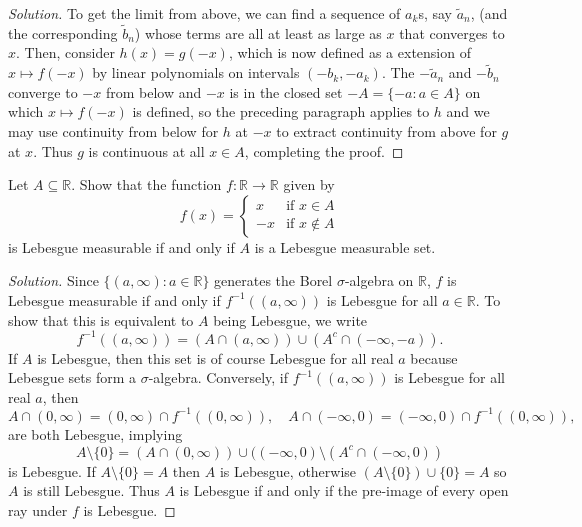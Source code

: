 \documentclass[10pt]{article}
\providecommand{\RR}{\mathbb R}
\providecommand{\inv}{^{-1}}
\newenvironment{soln}{\begin{proof}[Solution]}{\end{proof}}
\begin{document}
\begin{soln}
    To get the limit from above, we can find a sequence of $a_k$s,
    say $\widetilde a_n$, (and the corresponding $\widetilde b_n$) whose terms are
    all at least as large as $x$ that converges to $x$.
    Then, consider $h(x) = g(-x)$, which is now defined
    as a extension of $x\mapsto f(-x)$ by linear polynomials on intervals
    $(-b_k,-a_k)$. The $-\widetilde a_n$ and $-\widetilde b_n$
    converge to $-x$ from below and $-x$ is in the closed set
    $-A = \{-a : a\in A\}$ on which $x\mapsto f(-x)$
    is defined, so the preceding paragraph applies to $h$
    and we may use continuity from below
    for $h$ at $-x$ to extract continuity from above for $g$ at $x$.
    Thus $g$ is continuous at all $x\in A$, completing the proof.
\end{soln}

\begin{problem}
    Let $A\subseteq\RR$. Show that the function $f\colon\RR\to\RR$ given by
    \begin{equation*}
        f(x) = \begin{cases}
	    x & \text{if }x\in A\\
	    -x & \text{if }x\notin A
        \end{cases}
    \end{equation*}
    is Lebesgue measurable if and only if $A$ is a Lebesgue measurable set.
\end{problem}

\begin{soln}
    Since $\{(a,\infty) : a\in\RR\}$ generates the Borel $\sigma$-algebra on $\RR$,
    $f$ is Lebesgue measurable if and only if $f\inv((a,\infty))$ is Lebesgue
    for all $a\in\RR$. To show that this is equivalent to $A$ being Lebesgue,
    we write
    \begin{equation*}
        f\inv((a,\infty)) = (A\cap(a,\infty)) \cup (A^c\cap(-\infty,-a)).
    \end{equation*}
    If $A$ is Lebesgue, then this set is of course Lebesgue for all real $a$
    because Lebesgue sets form a $\sigma$-algebra.
    Conversely, if $f\inv((a,\infty))$ is Lebesgue for all real $a$, then
    \begin{equation*}
	A\cap(0,\infty) = (0,\infty)\cap f\inv((0,\infty)),
	\quad
	A\cap(-\infty,0) = (-\infty,0)\cap f\inv((0,\infty)),
    \end{equation*}
    are both Lebesgue, implying
    \begin{equation*}
	A\setminus\{0\}
	= (A\cap(0,\infty))\cup ((-\infty,0)\setminus(A^c\cap(-\infty,0))
    \end{equation*}
    is Lebesgue. If $A\setminus\{0\} = A$ then $A$ is Lebesgue,
    otherwise $(A\setminus\{0\}) \cup\{0\} = A$ so $A$ is still Lebesgue.
    Thus $A$ is Lebesgue if and only if the pre-image
    of every open ray under $f$ is Lebesgue.
\end{soln}
\end{document}

